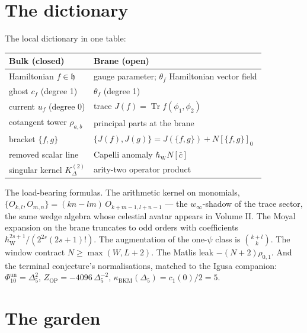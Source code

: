 \documentclass[11pt]{article}
\providecommand{\fh}{\mathfrak{h}}
\providecommand{\kBKM}{\kappa_{\mathrm{BKM}}}
\providecommand{\Dfive}{\Delta_5}
\providecommand{\Phiten}{\Phi_{10}}
\providecommand{\Tr}{\operatorname{Tr}}
\providecommand{\hbW}{\hbar_{\mathrm{W}}}
\begin{document}
\section{The dictionary}\label{sec:dictionary}

The local dictionary in one table:

\begin{center}
\renewcommand{\arraystretch}{1.25}
\begin{tabular}{ll}
\textbf{Bulk (closed)} & \textbf{Brane (open)}\\
\hline
Hamiltonian $f\in\fh$ & gauge parameter; $\theta_f$ Hamiltonian
vector field\\
ghost $c_f$ \textup{(degree 1)} & $\theta_f$ \textup{(degree 1)}\\
current $u_f$ \textup{(degree 0)} & trace $J(f)=\Tr f(\phi_1,\phi_2)$\\
cotangent tower $\rho_{a,b}$ & principal parts at the brane\\
bracket $\{f,g\}$ & $\{J(f),J(g)\}=J(\{f,g\})+N[\{f,g\}]_0$\\
removed scalar line & Capelli anomaly $\hbW N[\bar c]$\\
singular kernel $K^{(2)}_\Delta$ & arity-two operator product\\
\end{tabular}
\end{center}

The load-bearing formulas. The arithmetic kernel on monomials,
$\{O_{k,l},O_{m,n}\}=(kn-lm)\,O_{k+m-1,l+n-1}$ --- the
$w_\infty$-shadow of the trace sector, the same wedge algebra whose
celestial avatar appears in Volume II. The Moyal expansion on the
brane truncates to odd orders with coefficients
$\hbW^{2s+1}/(2^{2s}(2s+1)!)$. The augmentation of the one-$\psi$
class is $\binom{k+l}{k}$. The window contract $N\ge\max(W,L+2)$. The
Matlis leak $-(N+2)\rho_{0,1}$. And the terminal conjecture's
normalisations, matched to the Igusa companion:
$\Phiten^{\mathrm{un}}=\Dfive^2$,
$Z_{\mathrm{OP}}=-4096\,\Dfive^{-2}$,
$\kBKM(\Dfive)=c_1(0)/2=5$.

\section{The garden}\label{sec:garden}
\end{document}
